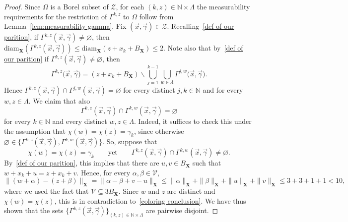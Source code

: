 \documentclass[11pt,reqno]{amsart}
\renewcommand{\le}{\leqslant}
\renewcommand{\setminus}{\smallsetminus}
\newcommand{\diam}{\mathrm{diam}}
\newcommand{\X}{\mathbf X}
\theoremstyle{remark}
\renewcommand{\subset}{\subseteq}
\newcommand{\N}{\mathbb N}
\renewcommand{\emptyset}{\varnothing}
\renewcommand{\1}{\mathbf 1}
\newcommand{\ZZ}{\mathcal{Z}}
\newcommand{\DD}{\mathscr{V}}
\begin{document}
\begin{proof} Since $\Omega$ is a Borel subset of $\ZZ$, for each $(k,z)\in \N\times \Lambda$ the measurability requirements for the restriction of $\Gamma^{k,z}$ to $\Omega$ follow from Lemma~\ref{lem:measurability gamma}. Fix $(\vec{x},\vec{\gamma})\in \ZZ$. Recalling~\eqref{def of our parition}, if  $\Gamma^{k,z}(\vec{x},\vec{\gamma})\neq\emptyset$, then  $\diam_{\X}(\Gamma^{k,z}(\vec{x},\vec{\gamma}))\le \diam_{\X}(z+x_k+B_{\X})\le 2$.  Note also that by~\eqref{def of our parition} if $\Gamma^{k,z}(\vec{x},\vec{\gamma})\neq\emptyset$, then
$$
\Gamma^{k,z}\big(\vec{x},\vec{\gamma}\big)=(z+x_k+B_{\X}) \setminus \bigcup_{j=1}^{k-1}\bigcup_{w\in \Lambda}\Gamma^{j,w}\big(\vec{x},\vec{\gamma}\big).
$$
Hence $\Gamma^{k,z}(\vec{x},\vec{\gamma})\cap \Gamma^{j,w}(\vec{x},\vec{\gamma})=\emptyset$ for every distinct $j,k\in \N$ and for every $w,z\in \Lambda$. We claim that also $$\Gamma^{k,z}(\vec{x},\vec{\gamma})\cap \Gamma^{k,w}(\vec{x},\vec{\gamma})=\emptyset$$ for every $k\in \N$ and every distinct $w,z\in \Lambda$. Indeed, it suffices to check this under the assumption that $\chi(w)=\chi(z)=\gamma_k$, since otherwise $\emptyset\in \{\Gamma^{k,z}(\vec{x},\vec{\gamma}), \Gamma^{k,w}(\vec{x},\vec{\gamma})\}$. So, suppose that $$\chi(w)=\chi(z)=\gamma_k\qquad \mathrm{yet}\qquad  \Gamma^{k,z}(\vec{x},\vec{\gamma})\cap \Gamma^{k,w}(\vec{x},\vec{\gamma})\neq\emptyset.$$ By~\eqref{def of our parition}, this implies that  there are $u,v\in B_{\X}$ such that $w+x_k+u=z+x_k+v$. Hence, for every $\alpha,\beta \in \DD$,
$$
\|(w+\alpha)-(z+\beta)\|_{\X}=\|\alpha-\beta+v-u\|_{\X}\le \|\alpha\|_{\X}+\|\beta\|_{\X}+\|u\|_{\X}+\|v\|_{\X}\le 3+3+1+1<10,
$$
where we used the fact that $\DD\subset 3B_{\X}$. Since $w$ and $z$ are distinct and $\chi(w)=\chi(z)$, this is in contradiction to~\eqref{coloring conclusion}. We have thus shown that the sets  $\{\Gamma^{k,z}(\vec{x},\vec{\gamma})\}_{(k,z)\in \N\times \Lambda}$ are pairwise disjoint.





\end{proof}
\end{document}
